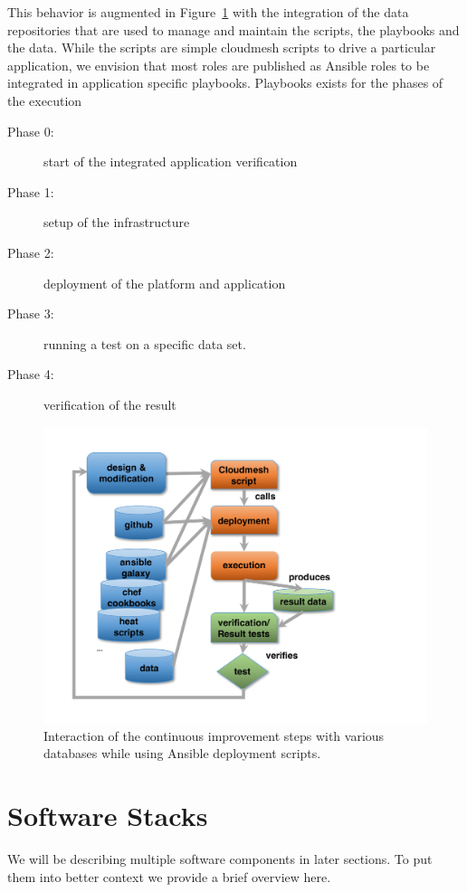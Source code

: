 \documentclass[9pt,twocolumn,twoside]{styles/osajnl}
\begin{document}
This behavior is augmented in Figure~\ref{F:NIST-devops-2} with the integration of the
data repositories that are used to manage and maintain the scripts,
the playbooks and the data. While the scripts are simple cloudmesh
scripts to drive a particular application, we envision that most roles
are published as Ansible roles to be integrated in application
specific playbooks. Playbooks exists for the phases of the execution

\begin{description}
\item[Phase 0:] start of the integrated application verification
\item[Phase 1:] setup of the infrastructure 
\item[Phase 2:] deployment of the platform and application
\item[Phase 3:] running a test on a specific data set.
\item[Phase 4:] verification of the result
\end{description}


\begin{figure}
  \centering
      \includegraphics[width=0.8\columnwidth]{images/nist-devops-2.pdf}
  \caption{Interaction of the continuous improvement steps with
    various databases while using Ansible deployment scripts.}
  \label{F:NIST-devops-2}
\end{figure}


\section{Software Stacks}

We will be describing multiple software components in later
sections. To put them into better context we provide a brief overview
here.
\end{document}
